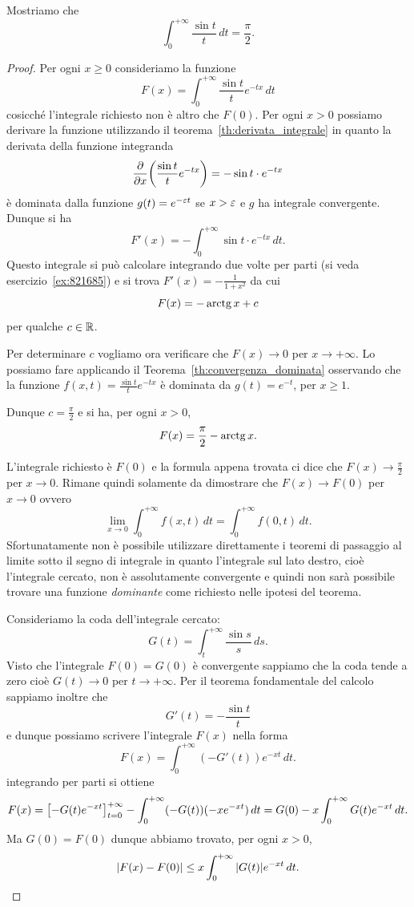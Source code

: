 \begin{exercise}
  \label{ex:integrale_sin_integrale}%
Mostriamo che 
  \[
    \int_0^{+\infty} \frac{\sin t}{t}\, dt = \frac \pi 2.
  \] 
\end{exercise}
\begin{proof}
Per ogni $x \ge 0$ consideriamo la funzione 
\[
  F(x) = \int_0^{+\infty} \frac{\sin t}{t}e^{-tx}\, dt
\]
cosicché l'integrale richiesto non è altro che $F(0)$.
Per ogni $x>0$
possiamo derivare la funzione utilizzando il teorema~\ref{th:derivata_integrale}
in quanto la derivata della funzione integranda 
\[
  \frac{\partial}{\partial x}{\left( \frac{\sin t}{t}e^{-tx} \right)} 
  = -\sin t \cdot e^{-tx}
\]
è dominata dalla funzione $g(t) = e^{- \varepsilon t}$ se $x>\varepsilon$ e 
$g$ ha integrale convergente.
Dunque si ha 
\[
  F'(x) = - \int_0^{+\infty} \sin t \cdot e^{-tx}\, dt. 
\]
Questo integrale si può calcolare integrando due volte per parti 
(si veda esercizio~\ref{ex:821685}) e si trova 
$F'(x) = -\frac{1}{1+x^2}$ da cui
\[
  F(x) = -\operatorname{arctg} x + c
\]
per qualche $c \in {\mathbb R}$.

Per determinare $c$ 
vogliamo ora verificare che $F(x) \to 0$ per $x\to +\infty$.
Lo possiamo fare applicando il Teorema~\ref{th:convergenza_dominata} osservando che 
la funzione $f(x,t) = \frac{\sin t}{t}e^{-tx}$ è dominata da $g(t) = e^{-t}$, per $x\ge 1$.

Dunque $c=\frac{\pi} 2$ e si ha, per ogni $x>0$,
\[
  F(x) = \frac{\pi} 2 - \operatorname{arctg} x.
\]

L'integrale richiesto è $F(0)$ e la formula appena trovata ci 
dice che $F(x)\to \frac \pi 2$ per $x\to 0$. 
Rimane quindi solamente da dimostrare che $F(x)\to F(0)$ per 
$x\to 0$ ovvero 
\[
  \lim_{x\to 0} \int_0^{+\infty} f(x,t) \, dt
  = \int_0^{+\infty} f(0,t) \, dt.
\]
Sfortunatamente non è possibile utilizzare direttamente i teoremi 
di passaggio al limite sotto il segno di integrale in quanto 
l'integrale sul lato destro, cioè l'integrale cercato, non 
è assolutamente convergente e quindi non sarà possibile trovare 
una funzione \emph{dominante} come richiesto nelle ipotesi del teorema.

Consideriamo la coda dell'integrale cercato:
\[
  G(t) = \int_t^{+\infty} \frac{\sin s}{s}\, ds.
\]
Visto che l'integrale $F(0) = G(0)$ è convergente sappiamo che la coda tende a zero 
cioè $G(t)\to 0$ per $t\to +\infty$.
Per il teorema fondamentale del calcolo sappiamo inoltre che 
\[
  G'(t) = -\frac{\sin t}{t}
\]
e dunque possiamo scrivere l'integrale $F(x)$ nella forma 
\[
  F(x) = \int_{0}^{+\infty} (-G'(t)) e^{-xt}\, dt.
\]
integrando per parti si ottiene 
\[
  F(x) = {\left[ -G(t)e^{-xt} \right]}_{t=0}^{+\infty} - \int_0^{+\infty} (-G(t))(-x e^{-xt})\, dt
  = G(0) - x \int_0^{+\infty} G(t) e^{-xt}\, dt.
\]
Ma $G(0)=F(0)$ dunque abbiamo trovato, per ogni $x>0$, 
\[
  {\left|F(x)-F(0)\right|} \le x \int_0^{+\infty} {\left|G(t)\right|} e^{-xt}\, dt.
\]


\end{proof}
